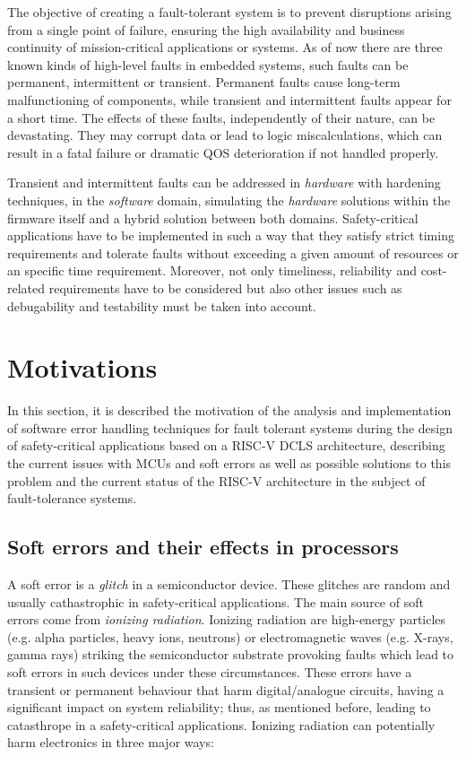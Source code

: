 \documentclass[10pt, a4paper]{report}
\begin{document}
The objective of creating a fault-tolerant system is to prevent disruptions
arising from a single point of failure, ensuring the high availability and
business continuity of mission-critical applications or systems. As of now there
are three known kinds of high-level faults in embedded systems, such faults can 
be permanent, intermittent or transient. Permanent faults cause long-term 
malfunctioning of components, while transient and intermittent faults appear for 
a short time. The effects of these faults, independently of their nature, can be 
devastating. They may corrupt data or lead to logic miscalculations, which can 
result in a fatal failure or dramatic \acrshort{QOS} deterioration if not 
handled properly. 

Transient and intermittent faults can be addressed in \emph{hardware} with
hardening techniques, in the \emph{software} domain, simulating the
\emph{hardware} solutions within the firmware itself and a hybrid solution
between both domains. Safety-critical applications have to be implemented in 
such a way that they satisfy strict timing requirements and tolerate faults 
without exceeding a given amount of resources or an specific time requirement. 
Moreover, not only timeliness, reliability and cost-related requirements have to 
be considered but also other issues such as debugability and testability must be
taken into account.

\section{Motivations}

In this section, it is described the motivation of the analysis and 
implementation of software error handling techniques for fault tolerant systems 
during the design of safety-critical applications based on a RISC-V 
\acrshort{DCLS} architecture, describing the current issues with 
\acrshort{MCU}s and soft errors as well as possible solutions to this problem
and the current status of the RISC-V architecture in the subject of
fault-tolerance systems.

\subsection{Soft errors and their effects in processors}

A soft error is a \emph{glitch} in a semiconductor device. These glitches are
random and usually cathastrophic in safety-critical applications. The main 
source of soft errors come from \emph{ionizing radiation}. Ionizing radiation 
are high-energy particles (e.g. alpha particles, heavy ions, neutrons) or
electromagnetic waves (e.g. X-rays, gamma rays) striking the semiconductor
substrate provoking faults which lead to soft errors in such devices under
these circumstances. These errors have a transient or permanent behaviour that 
harm digital/analogue circuits, having a significant impact on system 
reliability; thus, as mentioned before, leading to catasthrope in a 
safety-critical applications. Ionizing radiation can potentially harm 
electronics in three major ways:
\end{document}
